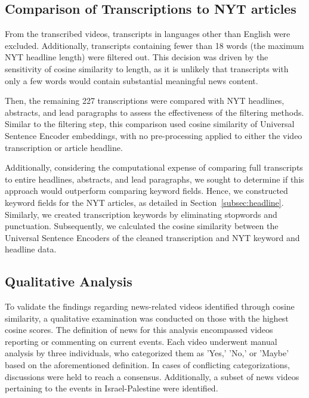 \documentclass{article}
\begin{document}
\subsection{Comparison of Transcriptions to NYT articles}
From the transcribed videos, transcripts in languages other than English were excluded. Additionally, transcripts containing fewer than 18 words (the maximum NYT headline length) were filtered out. This decision was driven by the sensitivity of cosine similarity to length, as it is unlikely that transcripts with only a few words would contain substantial meaningful news content. \newline

{\noindent}Then, the remaining 227 transcriptions were compared with NYT headlines, abstracts, and lead paragraphs to assess the effectiveness of the filtering methods. Similar to the filtering step, this comparison used cosine similarity of Universal Sentence Encoder embeddings, with no pre-processing applied to either the video transcription or article headline.\newline

{\noindent}Additionally, considering the computational expense of comparing full transcripts to entire headlines, abstracts, and lead paragraphs, we sought to determine if this approach would outperform comparing keyword fields. Hence, we constructed keyword fields for the NYT articles, as detailed in Section~\ref{subsec:headline}. Similarly, we created transcription keywords by eliminating stopwords and punctuation. Subsequently, we calculated the cosine similarity between the Universal Sentence Encoders of the cleaned transcription and NYT keyword and headline data. \newline

\subsection{Qualitative Analysis}
To validate the findings regarding news-related videos identified through cosine similarity, a qualitative examination was conducted on those with the highest cosine scores. The definition of news for this analysis encompassed videos reporting or commenting on current events. Each video underwent manual analysis by three individuals, who categorized them as 'Yes,' 'No,' or 'Maybe' based on the aforementioned definition. In cases of conflicting categorizations, discussions were held to reach a consensus. Additionally, a subset of news videos pertaining to the events in Israel-Palestine were identified.\newline
\end{document}

